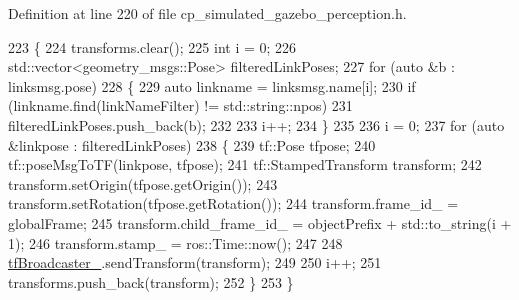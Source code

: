 Definition at line 220 of file cp\+\_\+simulated\+\_\+gazebo\+\_\+perception.\+h.


\begin{DoxyCode}
223             \{
224                 transforms.clear();
225                 \textcolor{keywordtype}{int} i = 0;
226                 std::vector<geometry\_msgs::Pose> filteredLinkPoses;
227                 \textcolor{keywordflow}{for} (\textcolor{keyword}{auto} &b : linksmsg.pose)
228                 \{
229                     \textcolor{keyword}{auto} linkname = linksmsg.name[i];
230                     \textcolor{keywordflow}{if} (linkname.find(linkNameFilter) != std::string::npos)
231                         filteredLinkPoses.push\_back(b);
232 
233                     i++;
234                 \}
235 
236                 i = 0;
237                 \textcolor{keywordflow}{for} (\textcolor{keyword}{auto} &linkpose : filteredLinkPoses)
238                 \{
239                     tf::Pose tfpose;
240                     tf::poseMsgToTF(linkpose, tfpose);
241                     tf::StampedTransform transform;
242                     transform.setOrigin(tfpose.getOrigin());
243                     transform.setRotation(tfpose.getRotation());
244                     transform.frame\_id\_ = globalFrame;
245                     transform.child\_frame\_id\_ = objectPrefix + std::to\_string(i + 1);
246                     transform.stamp\_ = ros::Time::now();
247 
248                     \hyperlink{classsm__moveit__4_1_1cl__perception__system_1_1CpSimulatedGazeboPerception_a413594aa743f273c844795ff9f2f724b}{tfBroadcaster\_}.sendTransform(transform);
249 
250                     i++;
251                     transforms.push\_back(transform);
252                 \}
253             \}
\end{DoxyCode}
\mbox{\label{classsm__moveit__4_1_1cl__perception__system_1_1CpSimulatedGazeboPerception_af42b5a4e239fcac98a222c34115c9bc0}} 
